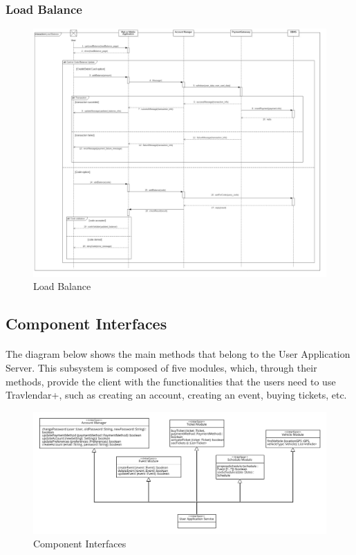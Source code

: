 \documentclass{article}
\begin{document}
				\subsubsection{Load Balance}
				\begin{figure}[H]
				\includegraphics[width=\linewidth]{Images/Sequence_Diagrams/8-Load_Balance_DD.jpg}
				\caption{Load Balance}
				\label{fig:SD8}
				\end{figure}
		\subsection{Component Interfaces}
			\paragraph{} The diagram below shows the main methods that belong to the User Application Server. This subsystem is composed of five modules, which, through their methods, provide the client with the functionalities that the users need to use Travlendar+, such as creating an account, creating an event, buying tickets, etc.
				\begin{figure}[H]
				\includegraphics[width=\linewidth]{Images/Architecture/Interface_Methods.png}
				\caption{Component Interfaces}
				\label{fig:CI	}
				\end{figure}
\end{document}
